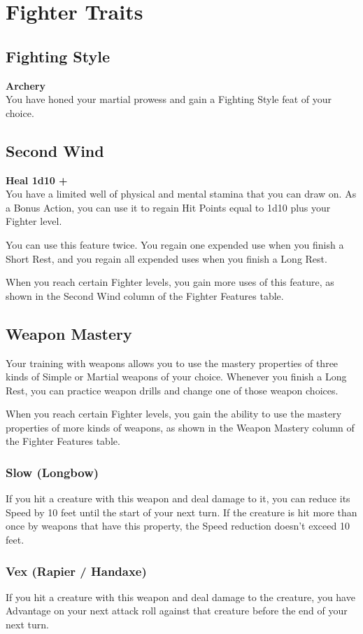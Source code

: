 \documentclass[letterpaper,openany,oneside,twocolumn]{book}
\begin{document}
\section*{Fighter Traits}
\subsection*{Fighting Style}
\textbf{Archery}\\
You have honed your martial prowess and gain a Fighting Style feat of your choice.
\subsection*{Second Wind}
\textbf{Heal 1d10 + }\\
You have a limited well of physical and mental stamina that you can draw on. As a Bonus Action, you can use it to regain Hit Points equal to 1d10 plus your Fighter level.

You can use this feature twice. You regain one expended use when you finish a Short Rest, and you regain all expended uses when you finish a Long Rest.

When you reach certain Fighter levels, you gain more uses of this feature, as shown in the Second Wind column of the Fighter Features table.
\subsection*{Weapon Mastery}
Your training with weapons allows you to use the mastery properties of three kinds of Simple or Martial weapons of your choice. Whenever you finish a Long Rest, you can practice weapon drills and change one of those weapon choices.

When you reach certain Fighter levels, you gain the ability to use the mastery properties of more kinds of weapons, as shown in the Weapon Mastery column of the Fighter Features table.
\subsubsection*{Slow (Longbow)}
If you hit a creature with this weapon and deal damage to it, you can reduce its Speed by 10 feet until the start of your next turn. If the creature is hit more than once by weapons that have this property, the Speed reduction doesn't exceed 10 feet.
\subsubsection*{Vex (Rapier / Handaxe)}
If you hit a creature with this weapon and deal damage to the creature, you have Advantage on your next attack roll against that creature before the end of your next turn.
\end{document}
